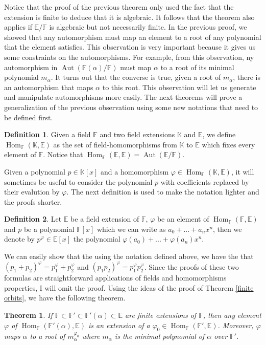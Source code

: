 \documentclass{article}
\theoremstyle{plain}
\newtheorem{theorem}{Theorem}[subsection]
\theoremstyle{definition}
\newtheorem*{definition}{Definition}
\newcommand{\F}{\mathbb{F}}
\newcommand{\E}{\mathbb{E}}
\newcommand{\K}{\mathbb{K}}
\DeclareMathOperator{\Aut}{Aut}
\DeclareMathOperator{\Hom}{Hom}
\begin{document}
Notice that the proof of the previous theorem only used the fact that the extension is finite to deduce that it is algebraic. It follows that the theorem also applies if $\E / \F$ is algebraic but not necessarily finite. In the previous proof, we showed that any automorphism must map an element to a root of any polynomial that the element satisfies. This observation is very important because it gives us some constraints on the automorphisms. For example, from this observation, ny automorphism in $\Aut(\F(\alpha) / \F)$ must map $\alpha$ to a root of its minimal polynomial $m_{\alpha}$. It turns out that the converse is true, given a root of $m_{\alpha}$, there is an automorphism that maps $\alpha$ to this root. This observation will let us generate and manipulate automorphisms more easily. The next theorems will prove a generalization of the previous observation using some new notations that need to be defined first.

\begin{definition}
    Given a field $\F$ and two field extensions $\K$ and $\E$, we define $\Hom_{\F}(\K, \E)$ as the set of field-homomorphisms from $\K$ to $\E$ which fixes every element of $\F$. Notice that $\Hom_{\F}(\E, \E) = \Aut(\E / \F)$.
\end{definition}

Given a polynomial $p \in \K[x]$ and a homomorphism $\varphi \in \Hom_{\F}(\K, \E)$, it will sometimes be useful to consider the polynomial $p$ with coefficients replaced by their evalution by $\varphi$. The next definition is used to make the notation lighter and the proofs shorter.

\begin{definition}
    Let $\E$ be a field extension of $\F$, $\varphi$ be an element of $\Hom_{\F}(\F, \E)$ and $p$ be a polynomial $\F[x]$ which we can write as $a_0 + ... + a_n x^n$, then we denote by $p^{\varphi} \in \E[x]$ the polynomial $\varphi(a_0) + ... + \varphi(a_n)x^n$.
\end{definition}

We can easily show that the using the notation defined above, we have the that $(p_1 + p_2)^{\varphi} = p_1^{\varphi} + p_2^{\varphi}$ and $(p_1p_2)^{\varphi} = p_1^{\varphi}p_2^{\varphi}$. Since the proofs of these two formulas are straightforward applications of fields and homomorphisms properties, I will omit the proof. Using the ideas of the proof of Theorem \ref{finite orbits}, we have the following theorem.

\begin{theorem}
\label{automorphisms map to roots}
    If $\F \subset \F' \subset \F'(\alpha) \subset \E$ are finite extensions of $\F$, then any element $\varphi$ of $\Hom_{\F}(\F'(\alpha), \E)$ is an extension of a $\varphi_0 \in \Hom_{\F}(\F', \E)$. Moreover, $\varphi$ maps $\alpha$ to a root of $m_{\alpha}^{\varphi_0}$ where $m_{\alpha}$ is the minimal polynomial of $\alpha$ over $\F'$. 
\end{theorem}
\end{document}
